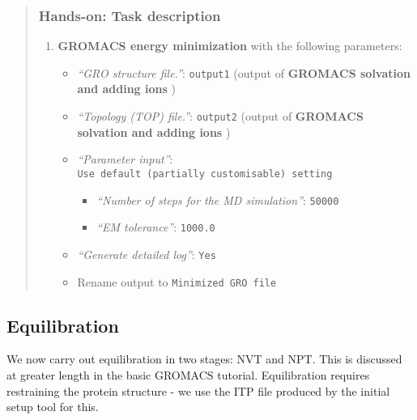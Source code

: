 \documentclass[twocolumn]{bmcart}%
\providecommand{\tightlist}{%
  \setlength{\itemsep}{0pt}\setlength{\parskip}{0pt}}
\providecommand{\tightlist}{%
  \setlength{\itemsep}{0pt}\setlength{\parskip}{0pt}}
\begin{document}
\begin{quote}
\subsubsection{Hands-on: Task
description}\label{hands-on-task-description-5}

\begin{enumerate}
\def\labelenumi{\arabic{enumi}.}
\tightlist
\item
  \textbf{GROMACS energy minimization} with the following parameters:

  \begin{itemize}
  \tightlist
  \item
    \emph{``GRO structure file.''}: \texttt{output1} (output of
    \textbf{GROMACS solvation and adding ions} )
  \item
    \emph{``Topology (TOP) file.''}: \texttt{output2} (output of
    \textbf{GROMACS solvation and adding ions} )
  \item
    \emph{``Parameter input''}:
    \texttt{Use\ default\ (partially\ customisable)\ setting}

    \begin{itemize}
    \tightlist
    \item
      \emph{``Number of steps for the MD simulation''}: \texttt{50000}
    \item
      \emph{``EM tolerance''}: \texttt{1000.0}
    \end{itemize}
  \item
    \emph{``Generate detailed log''}: \texttt{Yes}
  \item
    Rename output to \texttt{Minimized\ GRO\ file}
  \end{itemize}
\end{enumerate}

\end{quote}

\subsection{Equilibration}\label{equilibration}

We now carry out equilibration in two stages: NVT and NPT. This is
discussed at greater length in the basic GROMACS tutorial. Equilibration
requires restraining the protein structure - we use the ITP file
produced by the initial setup tool for this.
\end{document}
